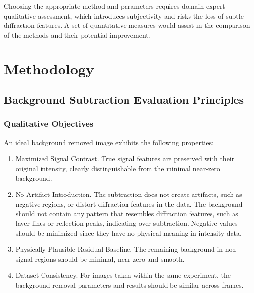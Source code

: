 \documentclass[iucr,review]{iucrjournals}
\begin{document}
Choosing the appropriate method and parameters requires domain-expert qualitative assessment, 
which introduces subjectivity and risks the loss of subtle diffraction features.
A set of quantitative measures would assist in 
the comparison of the methods and their potential improvement. 


\section{Methodology}

\subsection{Background Subtraction Evaluation Principles}
\subsubsection{Qualitative Objectives} 

An ideal background removed image exhibits the following properties:
\begin{enumerate}
        \item Maximized Signal Contrast. True signal features are preserved with their original intensity,
        clearly distinguishable from the minimal near-zero background.
        \item No Artifact Introduction. The subtraction does not create artifacts, such as negative regions,
        or distort diffraction features in the data. The background should not contain any pattern that resembles
        diffraction features, such as layer lines or reflection peaks, indicating over-subtraction.
        Negative values should be minimized since they have no physical meaning in intensity data.
        \item Physically Plausible Residual Baseline. The remaining background in
        non-signal regions should be minimal, near-zero and smooth.
        \item Dataset Consistency. For images taken within the same experiment, 
        the background removal parameters and results should be similar across frames.
\end{enumerate}
\end{document}
